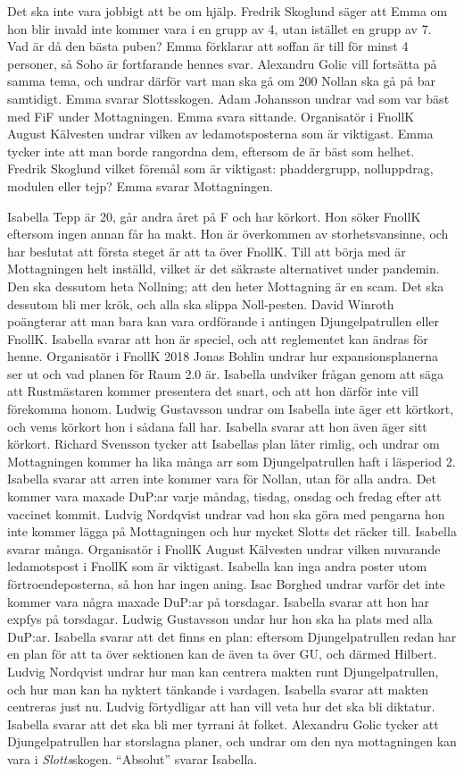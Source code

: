 \documentclass[hidelinks]{sektionsmote} %
\begin{document}
Det ska inte vara jobbigt att be om hjälp.
Fredrik Skoglund säger att Emma om hon blir invald inte kommer vara i en grupp av 4, utan istället en grupp av 7.
Vad är då den bästa puben?
Emma förklarar att soffan är till för minst 4 personer, så Soho är fortfarande hennes svar.
Alexandru Golic vill fortsätta på samma tema, och undrar därför vart man ska gå om 200 Nollan ska gå på bar samtidigt.
Emma svarar Slottsskogen.
Adam Johansson undrar vad som var bäst med FiF under Mottagningen.
Emma svara sittande.
Organisatör i FnollK August Kälvesten undrar vilken av ledamotsposterna som är viktigast.
Emma tycker inte att man borde rangordna dem, eftersom de är bäst som helhet.
Fredrik Skoglund vilket föremål som är viktigast: phaddergrupp, nolluppdrag, modulen eller tejp?
Emma svarar Mottagningen.

Isabella Tepp är 20, går andra året på F och har körkort.
Hon söker FnollK eftersom ingen annan får ha makt.
Hon är överkommen av storhetsvansinne, och har beslutat att första steget är att ta över FnollK.
Till att börja med är Mottagningen helt inställd, vilket är det säkraste alternativet under pandemin.
Den ska dessutom heta Nollning; att den heter Mottagning är en scam.
Det ska dessutom bli mer krök, och alla ska slippa Noll-pesten.
David Winroth poängterar att man bara kan vara ordförande i antingen Djungelpatrullen eller FnollK.
Isabella svarar att hon är speciel, och att reglementet kan ändras för henne.
Organisatör i FnollK 2018 Jonas Bohlin undrar hur expansionsplanerna ser ut och vad planen för Raum 2.0 är.
Isabella undviker frågan genom att säga att Rustmästaren kommer presentera det snart, och att hon därför inte vill förekomma honom.
Ludwig Gustavsson undrar om Isabella inte äger ett körtkort, och vems körkort hon i sådana fall har.
Isabella svarar att hon även äger sitt körkort.
Richard Svensson tycker att Isabellas plan låter rimlig, och undrar om Mottagningen kommer ha lika många arr som Djungelpatrullen haft i läsperiod 2.
Isabella svarar att arren inte kommer vara för Nollan, utan för alla andra.
Det kommer vara maxade DuP:ar varje måndag, tisdag, onsdag och fredag efter att vaccinet kommit.
Ludvig Nordqvist undrar vad hon ska göra med pengarna hon inte kommer lägga på Mottagningen och hur mycket Slotts det räcker till.
Isabella svarar många.
Organisatör i FnollK August Kälvesten undrar vilken nuvarande ledamotspost i FnollK som är viktigast.
Isabella kan inga andra poster utom förtroendeposterna, så hon har ingen aning.
Isac Borghed undrar varför det inte kommer vara några maxade DuP:ar på torsdagar.
Isabella svarar att hon har expfys på torsdagar.
Ludwig Gustavsson undar hur hon ska ha plats med alla DuP:ar.
Isabella svarar att det finns en plan: eftersom Djungelpatrullen redan har en plan för att ta över sektionen kan de även ta över GU, och därmed Hilbert.
Ludvig Nordqvist undrar hur man kan centrera makten runt Djungelpatrullen, och hur man kan ha nyktert tänkande i vardagen.
Isabella svarar att makten centreras just nu.
Ludvig förtydligar att han vill veta hur det ska bli diktatur.
Isabella svarar att det ska bli mer tyrrani åt folket.
Alexandru Golic tycker att Djungelpatrullen har storslagna planer, och undrar om den nya mottagningen kan vara i \textit{Slotts}skogen.
\enquote{Absolut} svarar Isabella.
\end{document}
